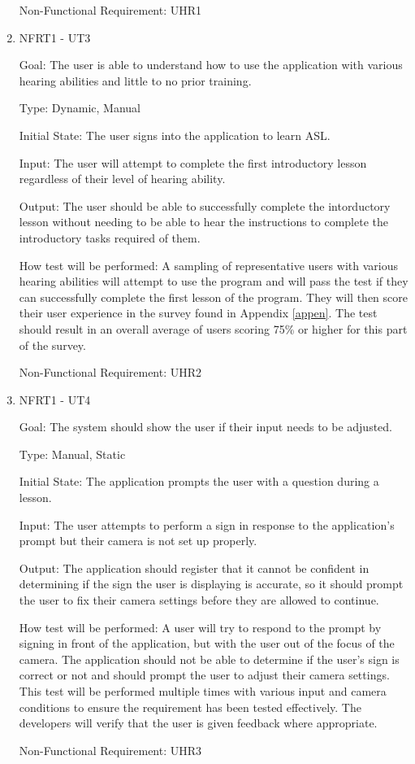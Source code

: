 \documentclass[12pt, titlepage]{article}
\begin{document}
\begin{enumerate}
Non-Functional Requirement: UHR1
					
\item{NFRT1 - UT3}

Goal: The user is able to understand how to use the application with various hearing abilities and little to no prior training. 

Type: Dynamic, Manual
					
Initial State: The user signs into the application to learn ASL.
					
Input: The user will attempt to complete the first introductory lesson regardless of their level of hearing ability.
					
Output: The user should be able to successfully complete the intorductory lesson without needing to be able to hear the instructions to complete the introductory tasks required of them. 
					
How test will be performed: A sampling of representative users with various hearing abilities will attempt to use the program and will pass the test if they can successfully complete the first lesson of the program. They will then score their user experience in the survey found in Appendix \ref{appen}. The test should result in an overall average of users scoring 75\% or higher for this part of the survey. 

Non-Functional Requirement: UHR2

\item{NFRT1 - UT4}

Goal: The system should show the user if their input needs to be adjusted. 

Type: Manual, Static
					
Initial State: The application prompts the user with a question during a lesson.
					
Input: The user attempts to perform a sign in response to the application's prompt but their camera is not set up properly.
					
Output: The application should register that it cannot be confident in determining if the sign the user is displaying is accurate, so it should prompt the user to fix their camera settings before they are allowed to continue.
					
How test will be performed: A user will try to respond to the prompt by signing in front of the application, but with the user out of the focus of the camera. The application should not be able to determine if the user's sign is correct or not and should prompt the user to adjust their camera settings. This test will be performed multiple times with various input and camera conditions to ensure the requirement has been tested effectively. The developers will verify that the user is given feedback where appropriate. 

Non-Functional Requirement: UHR3

\end{enumerate}
\end{document}
